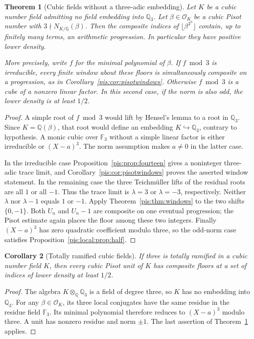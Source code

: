 \documentclass[11pt,a4paper]{article}
\newtheorem{theorem}{Theorem}[section]
\newtheorem{corollary}[theorem]{Corollary}
\theoremstyle{definition}\newtheorem{definition}[theorem]{Definition}
\theoremstyle{remark}\newtheorem{remark}[theorem]{Remark}
\begin{document}
\begin{theorem}[Cubic fields without a three-adic embedding]
\label{pis:local:thm:noembedding}
Let $K$ be a cubic number field admitting no field embedding into
$\mathbb Q_3$. Let $\beta\in\mathcal O_K$ be a cubic Pisot number
with $3\nmid N_{K/\mathbb Q}(\beta)$. Then the composite indices of
$\lfloor\beta^{3^n}\rfloor$ contain, up to finitely many terms,
an arithmetic progression. In particular they have positive lower
density.

More precisely, write $f$ for the minimal polynomial of $\beta$.
If $f\bmod3$ is irreducible, every finite window about these floors
is simultaneously composite on a progression, as in
Corollary~\ref{pis:cor:pisotwindows}. Otherwise $f\bmod3$ is a cube
of a nonzero linear factor. In this second case, if the norm is
also odd, the lower density is at least $1/2$.
\end{theorem}
\begin{proof}
A simple root of $f\bmod3$ would lift by Hensel's lemma to a root
in $\mathbb Q_3$. Since $K=\mathbb Q(\beta)$, that root would define
an embedding $K\hookrightarrow\mathbb Q_3$, contrary to hypothesis.
A monic cubic over $\mathbb F_3$ without a simple linear factor
is either irreducible or $(X-a)^3$. The norm assumption makes
$a\ne0$ in the latter case.

In the irreducible case Proposition~\ref{pis:prop:fourteen} gives a
noninteger three-adic trace limit, and
Corollary~\ref{pis:cor:pisotwindows} proves the asserted window statement.
In the remaining case the three Teichm\"uller lifts of the residual
roots are all $1$ or all $-1$. Thus the trace limit is $\lambda=3$
or $\lambda=-3$, respectively. Neither $\lambda$ nor $\lambda-1$
equals $1$ or $-1$. Apply Theorem~\ref{pis:thm:windows} to the two
shifts $\{0,-1\}$. Both $U_n$ and $U_n-1$ are composite on one
eventual progression; the Pisot estimate again places the floor
among these two integers. Finally $(X-a)^3$ has zero quadratic
coefficient modulo three, so the odd-norm case satisfies
Proposition~\ref{pis:local:prop:half}.
\end{proof}

\begin{corollary}[Totally ramified cubic fields]
\label{pis:local:cor:ramified}
If three is totally ramified in a cubic number field $K$, then
every cubic Pisot unit of $K$ has composite floors at a set of
indices of lower density at least $1/2$.
\end{corollary}
\begin{proof}
The algebra $K\otimes_{\mathbb Q}\mathbb Q_3$ is a field of
degree three, so $K$ has no embedding into $\mathbb Q_3$.
For any $\beta\in\mathcal O_K$, its three local conjugates have
the same residue in the residue field $\mathbb F_3$. Its minimal
polynomial therefore reduces to $(X-a)^3$ modulo three. A unit
has nonzero residue and norm $\pm1$. The last assertion of
Theorem~\ref{pis:local:thm:noembedding} applies.
\end{proof}
\end{document}
